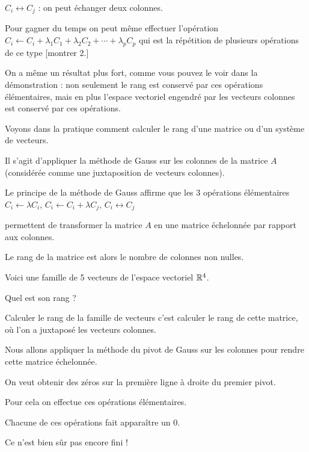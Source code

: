 \change
  $C_i \leftrightarrow C_j$ : on peut échanger deux colonnes.

\change
Pour gagner du temps on peut même effectuer
l'opération $C_i \leftarrow C_i + \lambda_1 C_1 + \lambda_2 C_2 + \cdots + \lambda_p C_p$
qui est la répétition de plusieurs opérations de ce type [montrer 2.]


On a même un résultat plus fort, comme vous pouvez le voir dans la démonstration :
non seulement le rang est conservé par ces opérations élémentaires,
mais en plus l'espace vectoriel engendré par les vecteurs colonnes est conservé
par ces opérations.


\diapo

Voyons dans la pratique comment calculer le rang d'une matrice ou d'un système de vecteurs.

\change
Il s'agit d'appliquer la méthode de Gauss sur les colonnes de la matrice $A$
(considérée comme une juxtaposition de vecteurs colonnes).

\change
Le principe de la méthode de Gauss affirme que les $3$ opérations élémentaires
$C_i \leftarrow \lambda C_i$, 
$C_i \leftarrow C_i+\lambda C_j$,
$C_i \leftrightarrow C_j$

\change
permettent de transformer la matrice $A$ en une matrice échelonnée
par rapport aux colonnes.

\change
Le rang de la matrice est alors le nombre de colonnes non nulles.



\diapo

Voici une famille de 5 vecteurs de l'espace vectoriel $\mathbb{R}^4$.

Quel est son rang ?

\change
Calculer le rang de la famille de vecteurs c'est calculer le rang de cette matrice,
où l'on a juxtaposé les vecteurs colonnes.

Nous allons appliquer la méthode du pivot de Gauss sur les colonnes pour rendre cette matrice échelonnée.

On veut obtenir des zéros sur la première ligne à droite du premier pivot.

\change
Pour cela on effectue ces opérations élémentaires.

\change
Chacune de ces opérations fait apparaître un $0$.

Ce n'est bien sûr pas encore fini !


\diapo

